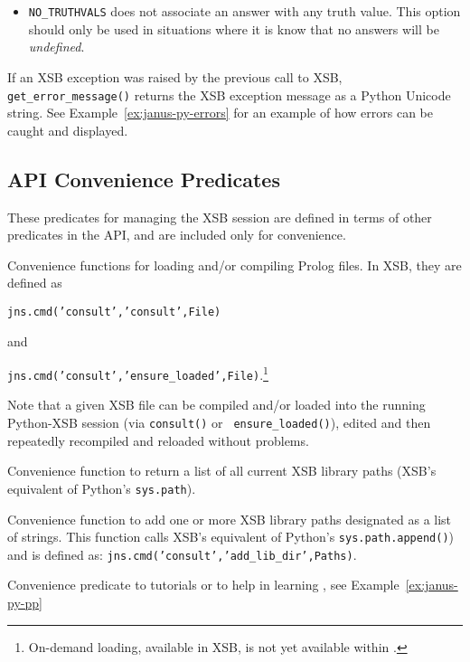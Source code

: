 \begin{description}
\begin{itemize}
      \item {\tt NO\_TRUTHVALS} does not associate an answer with any
        truth value.  This option should only be used in situations
        where it is know that no answers will be {\em undefined}.
        \ei
  \end{itemize}

  If an XSB exception was raised by the previous call to XSB, {\tt
    get\_error\_message()} returns the XSB exception message as a
  Python Unicode string.  See Example~\ref{ex:janus-py-errors} for an
  example of how errors can be caught and displayed.
  
\end{description}

\subsection{\januspy{} API Convenience Predicates}

These predicates for managing the XSB session are defined in terms of
other predicates in the \januspy{} API, and are included only for
convenience.

\begin{description}

%
  Convenience functions for loading and/or compiling Prolog files.  In
  XSB, they are defined as

  {\tt jns.cmd('consult','consult',File)}

\noindent
and

  {\tt jns.cmd('consult','ensure\_loaded',File)}.\footnote{On-demand
  loading, available in XSB, is not yet available within \januspy{}.}

  Note that a given XSB file can be compiled and/or loaded into the
  running Python-XSB session (via {\tt consult()} or {\tt
    ensure\_loaded()}), edited and then repeatedly recompiled and
    reloaded without problems.

%  
  Convenience function to return a list of all current XSB library
  paths (XSB's equivalent of Python's {\tt sys.path}).

%  
    Convenience function to add one or more XSB library paths
    designated as a list of strings.  This function calls XSB's
    equivalent of Python's {\tt sys.path.append()}) and is defined as:
    {\tt jns.cmd('consult','add\_lib\_dir',Paths)}.
  
  Convenience predicate to tutorials or to help in learning
  \januspy{}, see Example~\ref{ex:janus-py-pp}
\end{description}


